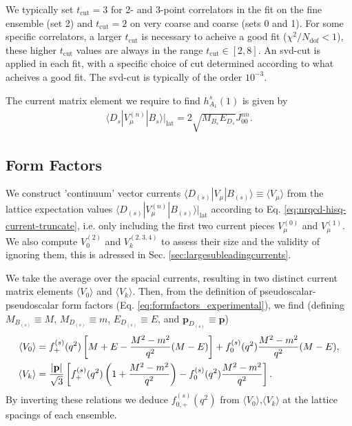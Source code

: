 We typically set $t_{\text{cut}}=3$ for 2- and 3-point correlators in the fit on the fine ensemble (set 2) and $t_{\text{cut}}=2$ on very coarse and coarse (sets 0 and 1). For some specific correlators, a larger $t_{\text{cut}}$ is necessary to acheive a good fit ($\chi^2/N_{\text{dof}} < 1$), these higher $t_{\text{cut}}$ values are always in the range $t_{\text{cut}}\in[2,8]$. An svd-cut is applied in each fit, with a specific choice of cut determined according to what acheives a good fit. The svd-cut is typically of the order $10^{-3}$.

The current matrix element we require to find $h_{A_1}^s(1)$ is given by
\begin{align}
  \langle D_s | V_{\mu}^{(n)} | B_s \rangle |_{\text{lat}} = 2 \sqrt{M_{B_s}E_{D_s}} J^{nn}_{00}.
  \label{eq:currentfit}
\end{align}

\subsection{Form Factors}

We construct 'continuum' vector currents $\langle D_{(s)}| V_{\mu} | B_{(s)} \rangle \equiv \langle V_{\mu} \rangle$ from the lattice expectation values $\langle D_{(s)} | V_{\mu}^{(n)} | B_{(s)} \rangle |_{\text{lat}}$ according to Eq. \eqref{eq:nrqcd-hisq-current-truncate}, i.e. only including the first two current pieces $V^{(0)}_{\mu}$ and $V^{(1)}_{\mu}$. We also compute $V^{(2)}_{0}$ and $V^{(2,3,4)}_k$ to assess their size and the validity of ignoring them, this is adressed in Sec. \ref{sec:largesubleadingcurrents}.

We take the average over the spacial currents, resulting in two distinct current matrix elements $\langle V_0 \rangle$ and $\langle V_k \rangle$. Then, from the definition of pseudoscalar-pseudoscalar form factors (Eq. \eqref{eq:formfactors_experimental}), we find (defining $M_{B_{(s)}}\equiv M$, $M_{D_{(s)}}\equiv m$, $E_{D_{(s)}}\equiv E$, and ${\textbf{p}}_{D_{(s)}} \equiv {\textbf{p}}$)
\begin{align}
  \langle V_0 \rangle &= f^{(s)}_+(q^2) \left[ M + E - {M^2-m^2\over q^2}(M-E) \right] + f^{(s)}_0(q^2) {M^2-m^2\over q^2}(M-E), \\
  \langle V_k \rangle &= {|{\textbf{p}}|\over \sqrt{3}} \left[ f^{(s)}_+(q^2) \left( 1 + {M^2-m^2\over q^2} \right) - f^{(s)}_0(q^2) {M^2-m^2\over q^2} \right].
\end{align}
By inverting these relations we deduce $f^{(s)}_{0,+}(q^2)$ from $\langle V_0 \rangle$,$\langle V_k \rangle$ at the lattice spacings of each ensemble.

